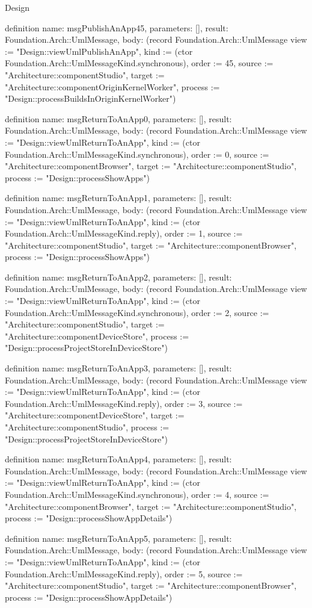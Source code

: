 \begin{lexlean}{Design}
\begin{semanticmodule}
definition{
  name: msgPublishAnApp45,
  parameters: [],
  result: Foundation.Arch::UmlMessage,
  body: (record Foundation.Arch::UmlMessage {view := "Design::viewUmlPublishAnApp", kind := (ctor Foundation.Arch::UmlMessageKind.synchronous), order := 45, source := "Architecture::componentStudio", target := "Architecture::componentOriginKernelWorker", process := "Design::processBuildsInOriginKernelWorker"})
}

definition{
  name: msgReturnToAnApp0,
  parameters: [],
  result: Foundation.Arch::UmlMessage,
  body: (record Foundation.Arch::UmlMessage {view := "Design::viewUmlReturnToAnApp", kind := (ctor Foundation.Arch::UmlMessageKind.synchronous), order := 0, source := "Architecture::componentBrowser", target := "Architecture::componentStudio", process := "Design::processShowApps"})
}

definition{
  name: msgReturnToAnApp1,
  parameters: [],
  result: Foundation.Arch::UmlMessage,
  body: (record Foundation.Arch::UmlMessage {view := "Design::viewUmlReturnToAnApp", kind := (ctor Foundation.Arch::UmlMessageKind.reply), order := 1, source := "Architecture::componentStudio", target := "Architecture::componentBrowser", process := "Design::processShowApps"})
}

definition{
  name: msgReturnToAnApp2,
  parameters: [],
  result: Foundation.Arch::UmlMessage,
  body: (record Foundation.Arch::UmlMessage {view := "Design::viewUmlReturnToAnApp", kind := (ctor Foundation.Arch::UmlMessageKind.synchronous), order := 2, source := "Architecture::componentStudio", target := "Architecture::componentDeviceStore", process := "Design::processProjectStoreInDeviceStore"})
}

definition{
  name: msgReturnToAnApp3,
  parameters: [],
  result: Foundation.Arch::UmlMessage,
  body: (record Foundation.Arch::UmlMessage {view := "Design::viewUmlReturnToAnApp", kind := (ctor Foundation.Arch::UmlMessageKind.reply), order := 3, source := "Architecture::componentDeviceStore", target := "Architecture::componentStudio", process := "Design::processProjectStoreInDeviceStore"})
}

definition{
  name: msgReturnToAnApp4,
  parameters: [],
  result: Foundation.Arch::UmlMessage,
  body: (record Foundation.Arch::UmlMessage {view := "Design::viewUmlReturnToAnApp", kind := (ctor Foundation.Arch::UmlMessageKind.synchronous), order := 4, source := "Architecture::componentBrowser", target := "Architecture::componentStudio", process := "Design::processShowAppDetails"})
}

definition{
  name: msgReturnToAnApp5,
  parameters: [],
  result: Foundation.Arch::UmlMessage,
  body: (record Foundation.Arch::UmlMessage {view := "Design::viewUmlReturnToAnApp", kind := (ctor Foundation.Arch::UmlMessageKind.reply), order := 5, source := "Architecture::componentStudio", target := "Architecture::componentBrowser", process := "Design::processShowAppDetails"})
}


\end{semanticmodule}
\end{lexlean}

